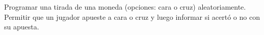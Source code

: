 Programar una tirada de una moneda (opciones: cara o cruz) aleatoriamente. Permitir que un jugador apueste a cara o cruz y luego informar si acertó o no con su apuesta.

